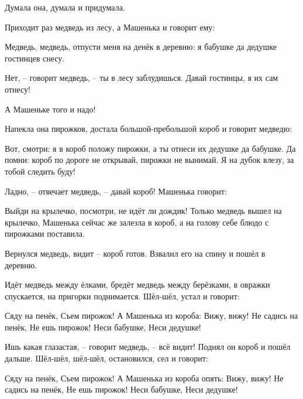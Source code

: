 Думала она, думала и придумала.

Приходит раз медведь из лесу, а Машенька и говорит ему:
\begin{dialogue}
    \item Медведь, медведь, отпусти меня на денёк в деревню: я бабушке да дедушке гостинцев снесу.
    \item Нет, -- говорит медведь, -- ты в лесу заблудишься. Давай гостинцы, я их сам отнесу!
\end{dialogue}
А Машеньке того и надо!

Напекла она пирожков, достала большой-пребольшой короб и говорит медведю:

\begin{dialogue}
    \item Вот, смотри: я в короб положу пирожки, а ты отнеси их дедушке да бабушке. Да помни: короб по дороге не открывай, пирожки не вынимай. Я на дубок влезу, за тобой следить буду!
    \item Ладно, -- отвечает медведь, -- давай короб! Машенька говорит:
    \item Выйди на крылечко, посмотри, не идёт ли дождик! Только медведь вышел на крылечко, Машенька сейчас же залезла в короб, а на голову себе блюдо с пирожками поставила.
\end{dialogue}

Вернулся медведь, видит -- короб готов. Взвалил его на спину и пошёл в деревню.

Идёт медведь между ёлками, бредёт медведь между берёзками, в овражки спускается, на пригорки поднимается. Шёл-шёл, устал и говорит:

\begin{fancyquotes}
    Сяду на пенёк, Съем пирожок! А Машенька из короба:
    Вижу, вижу! Не садись на пенёк, Не ешь пирожок! Неси бабушке, Неси дедушке!
\end{fancyquotes}

\begin{dialogue}
    \item Ишь какая глазастая, -- говорит медведь, -- всё видит! Поднял он короб и пошёл дальше. Шёл-шёл, шёл-шёл, остановился, сел и говорит:
\end{dialogue}

\begin{fancyquotes}
    Сяду на пенёк, Съем пирожок! А Машенька из короба опять: Вижу, вижу! Не садись на пенёк, Не ешь пирожок! Неси бабушке, Неси дедушке!
\end{fancyquotes}

